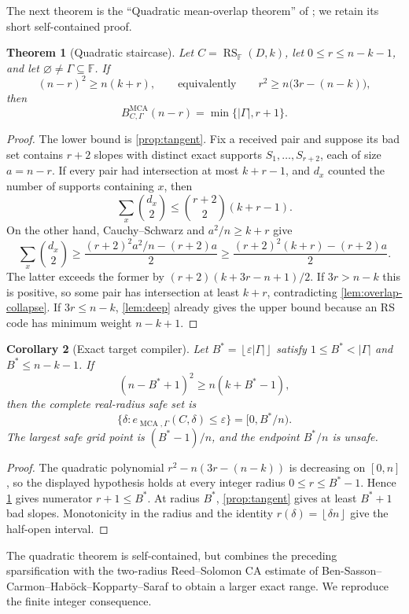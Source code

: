 \documentclass[11pt,a4paper]{amsart}
\numberwithin{equation}{section}
\newtheorem{theorem}{Theorem}[section]
\newtheorem{corollary}[theorem]{Corollary}
\theoremstyle{remark}
\DeclareMathOperator{\RS}{RS}
\DeclareMathOperator{\MCA}{MCA}
\newcommand{\F}{\mathbb F}
\newcommand{\eps}{\varepsilon}
\newcommand{\abs}[1]{\lvert#1\rvert}
\newcommand{\floor}[1]{\left\lfloor#1\right\rfloor}
\begin{document}
The next theorem is the ``Quadratic mean-overlap theorem'' of \cite{ChoShort26}; we retain its short self-contained proof.

\begin{theorem}[Quadratic staircase]\label{thm:quadratic}
Let $C=\RS_{\F}(D,k)$, let $0\le r\le n-k-1$, and let $\varnothing\ne\Gamma\subseteq\F$.  If
\[
 (n-r)^2\ge n(k+r),
 \qquad\text{equivalently}\qquad
 r^2\ge n\bigl(3r-(n-k)\bigr),
\]
then
\[
 B_{C,\Gamma}^{\MCA}(n-r)=\min\{\abs\Gamma,r+1\}.
\]
\end{theorem}

\begin{proof}
The lower bound is \cref{prop:tangent}.  Fix a received pair and suppose its bad set contains $r+2$ slopes with distinct exact supports $S_1,\ldots,S_{r+2}$, each of size $a=n-r$.  If every pair had intersection at most $k+r-1$, and $d_x$ counted the number of supports containing $x$, then
\[
 \sum_x\binom{d_x}{2}\le\binom{r+2}{2}(k+r-1).
\]
On the other hand, Cauchy--Schwarz and $a^2/n\ge k+r$ give
\[
 \sum_x\binom{d_x}{2}\ge\frac{(r+2)^2a^2/n-(r+2)a}{2}
 \ge\frac{(r+2)^2(k+r)-(r+2)a}{2}.
\]
The latter exceeds the former by $(r+2)(k+3r-n+1)/2$.  If $3r>n-k$ this is positive, so some pair has intersection at least $k+r$, contradicting \cref{lem:overlap-collapse}.  If $3r\le n-k$, \cref{lem:deep} already gives the upper bound because an RS code has minimum weight $n-k+1$.
\end{proof}

\begin{corollary}[Exact target compiler]\label{cor:target}
Let $B^*=\floor{\eps\abs\Gamma}$ satisfy $1\le B^*<\abs\Gamma$ and $B^*\le n-k-1$.  If
\[
 (n-B^*+1)^2\ge n(k+B^*-1),
\]
then the complete real-radius safe set is
\[
 \{\delta:e_{\MCA,\Gamma}(C,\delta)\le\eps\}=[0,B^*/n).
\]
The largest safe grid point is $(B^*-1)/n$, and the endpoint $B^*/n$ is unsafe.
\end{corollary}

\begin{proof}
The quadratic polynomial $r^2-n(3r-(n-k))$ is decreasing on $[0,n]$, so the displayed hypothesis holds at every integer radius $0\le r\le B^*-1$.  Hence \cref{thm:quadratic} gives numerator $r+1\le B^*$.  At radius $B^*$, \cref{prop:tangent} gives at least $B^*+1$ bad slopes.  Monotonicity in the radius and the identity $r(\delta)=\floor{\delta n}$ give the half-open interval.
\end{proof}


The quadratic theorem is self-contained, but \cite{ChoShort26} combines the preceding sparsification with the two-radius Reed--Solomon CA estimate of Ben-Sasson--Carmon--Hab\"ock--Kopparty--Saraf to obtain a larger exact range.  We reproduce the finite integer consequence.
\end{document}
